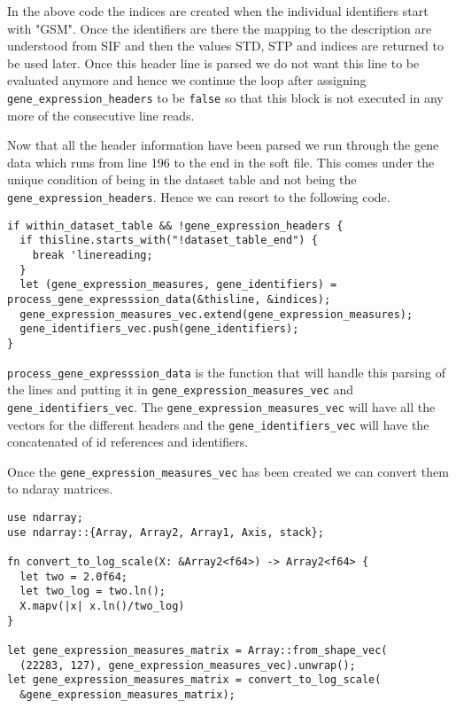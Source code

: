 \documentclass{book}
\begin{document}
In the above code the indices are created when the individual identifiers start with "GSM". Once the identifiers are there the mapping to the description are understood from SIF and then the values STD, STP and indices are returned to be used later. Once this header line is parsed we do not want this line to be evaluated anymore and hence we continue the loop after assigning \lstinline{gene_expression_headers} to be \lstinline{false} so that this block is not executed in any more of the consecutive line reads.

Now that all the header information have been parsed we run through the gene data which runs from line 196 to the end in the soft file. This comes under the unique condition of being in the dataset table and not being the \lstinline{gene_expression_headers}. Hence we can resort to the following code.

\begin{lstlisting}[caption={chapter7/statistics/src/main.rs}, basicstyle=\small]
if within_dataset_table && !gene_expression_headers {
  if thisline.starts_with("!dataset_table_end") {
    break 'linereading;
  }
  let (gene_expression_measures, gene_identifiers) = process_gene_expresssion_data(&thisline, &indices);
  gene_expression_measures_vec.extend(gene_expression_measures);
  gene_identifiers_vec.push(gene_identifiers);
}
\end{lstlisting}

\lstinline{process_gene_expresssion_data} is the function that will handle this parsing of the lines and putting it in \lstinline{gene_expression_measures_vec} and \lstinline{gene_identifiers_vec}. The \lstinline{gene_expression_measures_vec} will have all the vectors for the different headers and the \lstinline{gene_identifiers_vec} will have the concatenated of id references and identifiers.

Once the \lstinline{gene_expression_measures_vec} has been created we can convert them to ndaray matrices.

\begin{lstlisting}[caption={chapter7/statistics/src/main.rs}, basicstyle=\small]
use ndarray;
use ndarray::{Array, Array2, Array1, Axis, stack};

fn convert_to_log_scale(X: &Array2<f64>) -> Array2<f64> {
  let two = 2.0f64;
  let two_log = two.ln();
  X.mapv(|x| x.ln()/two_log)
}

let gene_expression_measures_matrix = Array::from_shape_vec(
  (22283, 127), gene_expression_measures_vec).unwrap();
let gene_expression_measures_matrix = convert_to_log_scale(
  &gene_expression_measures_matrix);
\end{lstlisting}
\end{document}
